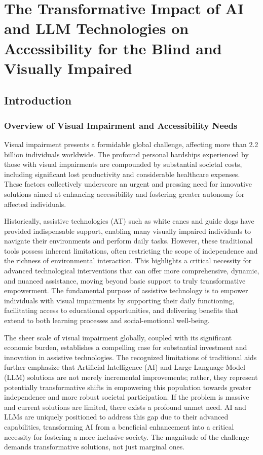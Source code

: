 \chapter{The Transformative Impact of AI and LLM Technologies on Accessibility for the Blind and Visually Impaired}
\label{chap:ai-llm-accessibility}

\section{Introduction}
\label{sec:introduction}

\subsection{Overview of Visual Impairment and Accessibility Needs}
\label{subsec:overview-visual-impairment}

Visual impairment presents a formidable global challenge, affecting more than 2.2 billion individuals worldwide. The profound personal hardships experienced by those with visual impairments are compounded by substantial societal costs, including significant lost productivity and considerable healthcare expenses. These factors collectively underscore an urgent and pressing need for innovative solutions aimed at enhancing accessibility and fostering greater autonomy for affected individuals. \cite{arxiv_visual_impairment}

Historically, assistive technologies (AT) such as white canes and guide dogs have provided indispensable support, enabling many visually impaired individuals to navigate their environments and perform daily tasks. However, these traditional tools possess inherent limitations, often restricting the scope of independence and the richness of environmental interaction. This highlights a critical necessity for advanced technological interventions that can offer more comprehensive, dynamic, and nuanced assistance, moving beyond basic support to truly transformative empowerment. \cite{aimodels2024} The fundamental purpose of assistive technology is to empower individuals with visual impairments by supporting their daily functioning, facilitating access to educational opportunities, and delivering benefits that extend to both learning processes and social-emotional well-being. \cite{wjaets2024}

The sheer scale of visual impairment globally, coupled with its significant economic burden, establishes a compelling case for substantial investment and innovation in assistive technologies. The recognized limitations of traditional aids further emphasize that Artificial Intelligence (AI) and Large Language Model (LLM) solutions are not merely incremental improvements; rather, they represent potentially transformative shifts in empowering this population towards greater independence and more robust societal participation. If the problem is massive and current solutions are limited, there exists a profound unmet need. AI and LLMs are uniquely positioned to address this gap due to their advanced capabilities, transforming AI from a beneficial enhancement into a critical necessity for fostering a more inclusive society. The magnitude of the challenge demands transformative solutions, not just marginal ones.

